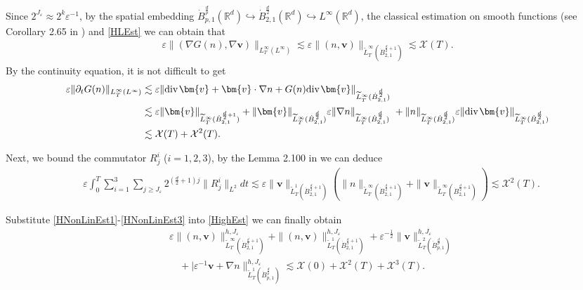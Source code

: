 \documentclass{amsart}
\theoremstyle{definition}
\theoremstyle{remark}
\numberwithin{equation}{section}
\def\d{\partial}
\def\dB{{\dot {B}}}
\renewcommand{\div}{\mbox{\rm div}\;\!}
\def\cX{{\mathcal X}}
\def\tL{\widetilde{L}}
\def\bv{{\bm{v} }}
\newcommand\R{\mathbb{R}}
\begin{document}
Since $2^{J_\varepsilon}\approx 2^{k}\varepsilon^{-1}$, by the spatial embedding
$\dB_{p,1}^{\frac{d}{p}}(\R^d)\hookrightarrow \dB_{2,1}^{\frac{d}{2}}(\R^d)\hookrightarrow L^\infty(\R^d)$, the classical estimation on smooth functions (see Corollary 2.65 in \cite{chemin}) and \eqref{HLEst} we can obtain that
\begin{equation}\label{HNonLinEst1}
\begin{split}
\varepsilon\|(\nabla G(n),\nabla \bv)\|_{L_T^\infty(L^\infty)}
\lesssim
\varepsilon\|(n, \bv)\|_{\tL_T^\infty(\dB_{2,1}^{\frac{d}{2}+1})}
\lesssim\cX(T).
\end{split}
\end{equation}
By the continuity equation, it is not difficult to get
\begin{equation}\label{HNonLinEst2}
\begin{split}
\varepsilon\|\d_t G(n)\|_{L_T^\infty(L^\infty)}
&\lesssim
\varepsilon \|\div \bv+\bv \cdot  \nabla n
+ G(n)\div\bv\|_{\tL_T^\infty(\dB_{2,1}^{\frac{d}{2}})}\\
&\lesssim
\varepsilon\|\bv\|_{\tL_T^\infty(\dB_{2,1}^{\frac{d}{2}+1})}
+\|\bv\|_{\tL_T^\infty(\dB_{2,1}^{\frac{d}{2}})}\varepsilon \|\nabla n\|_{\tL_T^\infty(\dB_{2,1}^{\frac{d}{2}})}\
+\|n\|_{\tL_T^\infty(\dB_{2,1}^{\frac{d}{2}})}\varepsilon \|\div \bv\|_{\tL_T^\infty(\dB_{2,1}^{\frac{d}{2}})}\\
&\lesssim
\cX(T)+\cX^2(T).
\end{split}
\end{equation}

Next, we bound the commutator $R_j^i$ ($i=1,2,3$), by the Lemma 2.100 in \cite{chemin} we can deduce
\begin{equation}\label{HNonLinEst3}
\begin{split}
&\varepsilon\int_0^T \sum_{i=1}^3\sum_{j\geq J_\varepsilon}2^{(\frac{d}{2}+1)j}
\|R_j^i\|_{L^2}dt
\lesssim
\varepsilon\|\bv\|_{\tL_T^1(\dB_{2,1}^{\frac{d}{2}+1})}
\left(\|n\|_{\tL_T^\infty(\dB_{2,1}^{\frac{d}{2}+1})}
+\|\bv\|_{\tL_T^\infty(\dB_{2,1}^{\frac{d}{2}+1})}
\right)
\lesssim
\cX^2(T).
\end{split}
\end{equation}

Substitute \eqref{HNonLinEst1}-\eqref{HNonLinEst3} into \eqref{HighEst} we can finally obtain
\begin{equation}\label{HighEst2}
\begin{split}
&\varepsilon\|(n, \bv)\|_{\tL_T^\infty(\dB_{2,1}^{\frac{d}{2}+1})}^{h,J_\varepsilon}
+\|(n, \bv)\|_{\tL_T^1(\dB_{2,1}^{\frac{d}{2}+1})}^{h,J_\varepsilon}
+\varepsilon^{-\frac{1}{2}}\|\bv\|_{\tL_T^2(\dB_{p,1}^{\frac{d}{p}})}^{h,J_\varepsilon}\\
&\quad+|\varepsilon^{-1}\bv+\nabla n\|_{\tL_T^1(\dot B_{p,1}^{\frac{d}{p}})}^{h,J_\varepsilon}
\lesssim
\cX(0)+  \cX^2(T)+\cX^3(T).
\end{split}
\end{equation}
\end{document}
